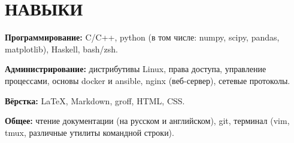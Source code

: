 \section{НАВЫКИ}

\begin{description}

    \setlength\itemsep{-0.4em}

    \item{\bfseries Программирование:}
    C/C++, python (в том числе: numpy, scipy, pandas, matplotlib), Haskell, bash/zsh.

    \item{\bfseries Администрирование:}
    дистрибутивы Linux, права доступа, управление процессами, основы docker и ansible, nginx (веб-сервер),
    сетевые протоколы.
    
    \item{\bfseries Вёрстка:}
    \LaTeX, Markdown, groff, HTML, CSS.

    \item{\bfseries Общее:}
    чтение документации (на русском и английском), git, терминал (vim, tmux, различные утилиты командной строки).

\end{description}
    
    \vspace{.7em}
